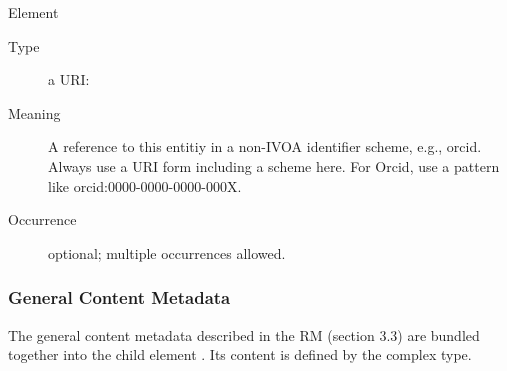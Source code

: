 \documentclass[11pt,a4paper]{ivoa}
\begin{document}
\begin{generated}
\begin{bigdescription}
\begin{description}
\end{description}
\item[Element \xmlel{altIdentifier}]
\begin{description}
\item[Type] a URI: 
\item[Meaning] 
                 A reference to this entitiy in a non-IVOA identifier
                 scheme, e.g., orcid.  Always use a URI form including
                 a scheme here.  For Orcid, use a pattern like
                 orcid:0000-0000-0000-000X.
              
\item[Occurrence] optional; multiple occurrences allowed.

\end{description}


\end{bigdescription}\endgroup

\endgroup
\end{generated}




\subsubsection{General Content Metadata}


The general content metadata described in the RM
(section 3.3) are bundled together into the 
child element .  Its content is
defined by the  complex type.
\end{document}
